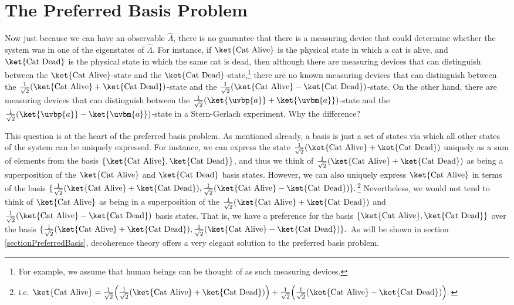 \section{The Preferred Basis Problem\protect\footnotemark}
Now just because we can have an observable $\hat{\Lambda}$, there is no guarantee that there is a measuring device that could determine whether the system was in one of the eigenstates of $\hat{\Lambda}$. For instance, if $\ket{\text{Cat Alive}}$ is the physical state in which a cat is alive, and $\ket{\text{Cat Dead}}$ is the physical state in which the same cat is dead, then although there are measuring devices that can distinguish between the $\ket{\text{Cat Alive}}$-state and the $\ket{\text{Cat Dead}}$-state,\footnote{For example, we assume that human beings can be thought of as such measuring devices.} there are no known measuring devices that can distinguish between the $\frac{1}{\sqrt{2}}(\ket{\text{Cat Alive}}+\ket{\text{Cat Dead}})$-state and the $\frac{1}{\sqrt{2}}(\ket{\text{Cat Alive}}-\ket{\text{Cat Dead}})$-state. On the other hand, there are measuring devices that can distinguish between the $\frac{1}{\sqrt{2}}(\ket{\uvbp{a}}+\ket{\uvbm{a}})$-state and the $\frac{1}{\sqrt{2}}(\ket{\uvbp{a}}-\ket{\uvbm{a}})$-state in a Stern-Gerlach experiment. Why the difference?

This question is at the heart of the preferred basis problem. As mentioned already, a basis is just a set of states via which all other states of the system can be uniquely expressed. For instance, we can express the state $\frac{1}{\sqrt{2}}(\ket{\text{Cat Alive}}+\ket{\text{Cat Dead}})$ uniquely as a sum of elements from the basis $\{\ket{\text{Cat Alive}}, \ket{\text{Cat Dead}}\}$, and thus we think of $\frac{1}{\sqrt{2}}(\ket{\text{Cat Alive}}+\ket{\text{Cat Dead}})$ as being a superposition of the $\ket{\text{Cat Alive}}$ and $\ket{\text{Cat Dead}}$ basis states. However, we can also uniquely express  $\ket{\text{Cat Alive}}$ in terms of the basis $\{\frac{1}{\sqrt{2}}(\ket{\text{Cat Alive}}+\ket{\text{Cat Dead}}), \frac{1}{\sqrt{2}}(\ket{\text{Cat Alive}}-\ket{\text{Cat Dead}})\}.$\footnote{i.e. $\ket{\text{Cat Alive}}= \frac{1}{\sqrt{2}}\Big(\frac{1}{\sqrt{2}}(\ket{\text{Cat Alive}}+\ket{\text{Cat Dead}})\Big)+\frac{1}{\sqrt{2}}\Big( \frac{1}{\sqrt{2}}(\ket{\text{Cat Alive}}-\ket{\text{Cat Dead}})\Big). $} Nevertheless, we would not tend to think of $\ket{\text{Cat Alive}}$ as being in a superposition of the $\frac{1}{\sqrt{2}}(\ket{\text{Cat Alive}}+\ket{\text{Cat Dead}}) $ and $\frac{1}{\sqrt{2}}(\ket{\text{Cat Alive}}-\ket{\text{Cat Dead}})$ basis states. That is, we have a preference for the basis $\{\ket{\text{Cat Alive}}, \ket{\text{Cat Dead}}\}$ over the basis $\{\frac{1}{\sqrt{2}}(\ket{\text{Cat Alive}}+\ket{\text{Cat Dead}}), \frac{1}{\sqrt{2}}(\ket{\text{Cat Alive}}-\ket{\text{Cat Dead}})\}.$ As will be shown in section \ref{sectionPreferredBasis}, decoherence theory offers a very elegant solution to the preferred basis problem.
